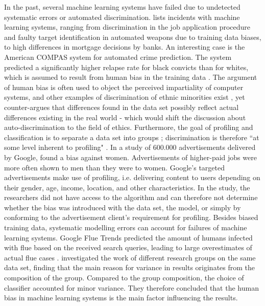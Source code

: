 In the past, several machine learning systems have failed due to undetected systematic errors or automated discrimination. \cite{guidotti2018survey} lists incidents with machine learning systems, ranging from discrimination in the job application procedure and faulty target identification in automated weapons due to training data biases, to high differences in mortgage decisions by banks.\newline
An interesting case is the American COMPAS system for automated crime prediction. The system predicted a significantly higher relapse rate for black convicts than for whites, which is assumed to result from human bias in the training data \cite{guidotti2018survey}. The argument of human bias is often used to object the perceived impartiality of computer systems, and other examples of discrimination of ethnic minorities exist \cite{guidotti2018survey}, yet \cite{skeem2016risk} counter-argues that differences found in the data set possibly reflect actual differences existing in the real world - which would shift the discussion about auto-discrimination to the field of ethics. Furthermore, the goal of profiling and classification is to separate a data set into groups \cite{goodman16eu}; discrimination is therefore ``at some level inherent to profiling" \cite{datta2015automated}.\newline
In a study of 600.000 advertisements delivered by Google, \cite{datta2015automated} found a bias against women. Advertisements of higher-paid jobs were more often shown to men than they were to women. Google's targeted advertisements make use of profiling, i.e. delivering content to users depending on their gender, age, income, location, and other characteristics. In the study, the researchers did not have access to the algorithm and can therefore not determine whether the bias was introduced with the data set, the model, or simply by conforming to the advertisement client's requirement for profiling.\newline
Besides biased training data, systematic modelling errors can account for failures of machine learning systems. Google Flue Trends predicted the amount of humans infected with flue based on the received search queries, leading to large overestimates of actual flue cases \cite{preece2018asking}. \cite{shepperd2014researcher} investigated the work of different research groups on the same data set, finding that the main reason for variance in results originates from the composition of the group. Compared to the group composition, the choice of classifier accounted for minor variance. They therefore concluded that the human bias in machine learning systems is the main factor influencing the results.\newline
